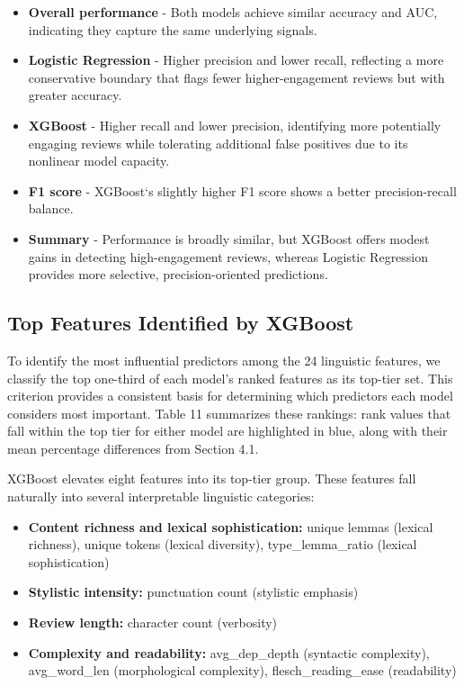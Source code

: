 \documentclass[12pt]{article}
\begin{document}
\begin{itemize}

\item \textbf{Overall performance} - Both models achieve similar accuracy and AUC, indicating they capture the same underlying signals. 

\item \textbf{Logistic Regression} - Higher precision and lower recall, reflecting a more conservative boundary that flags fewer higher-engagement reviews but with greater accuracy.

\item \textbf{XGBoost} - Higher recall and lower precision, identifying more potentially engaging reviews while tolerating additional false positives due to its nonlinear model capacity.  

\item \textbf{F1 score} - XGBoost`s slightly higher F1 score shows a better precision-recall balance.

\item \textbf{Summary} - Performance is broadly similar, but XGBoost offers modest gains in detecting high-engagement reviews, whereas Logistic Regression provides more selective, precision-oriented predictions.  

\end{itemize}  


\subsection{Top Features Identified by XGBoost}

To identify the most influential predictors among the 24 linguistic features, we classify the top one-third of each model's ranked features as its top-tier set. This criterion provides a consistent basis for determining which predictors each model considers most important. 
Table 11 summarizes these rankings: rank values that fall within the top tier for either model are highlighted in blue, along with their mean percentage differences from Section 4.1.

XGBoost elevates eight features into its top-tier group. These features fall naturally into several interpretable linguistic categories: 

\begin{itemize}

\item \textbf{Content richness and lexical sophistication:}  
unique lemmas (lexical richness), unique tokens (lexical diversity), type\_lemma\_ratio (lexical sophistication)

\item \textbf{Stylistic intensity:}  
punctuation count (stylistic emphasis)

\item \textbf{Review length:}  
character count (verbosity)

\item \textbf{Complexity and readability:}  
avg\_dep\_depth (syntactic complexity), avg\_word\_len (morphological complexity), flesch\_reading\_ease (readability)

\end{itemize}
\end{document}
